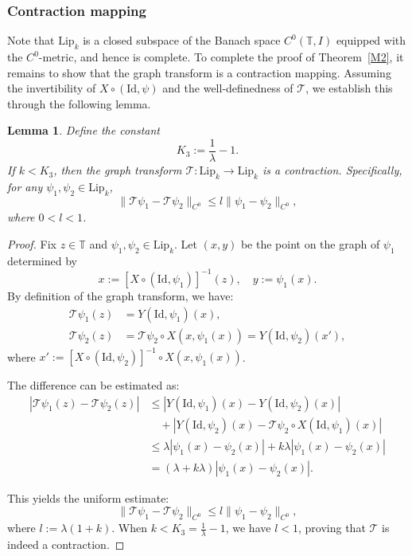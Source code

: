 \documentclass{amsart}
\newcommand{\Lip}{\mathrm{Lip}}
\newcommand{\Id}{\mathrm{Id}}
\newcommand{\T}{\mathbb{T}}
\newtheorem{Lemma}[Definition]{Lemma}
\theoremstyle{definition}
\begin{document}
\subsubsection{Contraction mapping}
Note that $\Lip_k$ is a closed subspace of the Banach space $C^0(\T,I)$ equipped with the $C^0$-metric, and hence is complete. To complete the proof of Theorem~\ref{M2}, it remains to show that the graph transform is a contraction mapping. Assuming the invertibility of $X \circ (\Id,\psi)$ and the well-definedness of $\mathcal{T}$, we establish this through the following lemma.

\begin{Lemma}\label{ctrmap}
Define the constant
\[
K_3 := \frac{1}{\lambda} - 1.
\]
If $k < K_3$, then the graph transform $\mathcal{T}: \Lip_k \to \Lip_k$ is a contraction. Specifically, for any $\psi_1, \psi_2 \in \Lip_k$,
\[
\|\mathcal{T}\psi_1 - \mathcal{T}\psi_2\|_{C^0} \leq l \|\psi_1 - \psi_2\|_{C^0},
\]
where $0 < l < 1$.
\end{Lemma}

\begin{proof}
Fix $z \in \T$ and $\psi_1, \psi_2 \in \Lip_k$. Let $(x,y)$ be the point on the graph of $\psi_1$ determined by
\[
x := [X \circ (\Id, \psi_1)]^{-1}(z), \quad y := \psi_1(x).
\]
By definition of the graph transform, we have:
\begin{align*}
\mathcal{T}\psi_1(z) &= Y(\Id, \psi_1)(x), \\
\mathcal{T}\psi_2(z) &= \mathcal{T}\psi_2 \circ X(x, \psi_1(x)) = Y(\Id, \psi_2)(x'),
\end{align*}
where $x' := [X \circ (\Id, \psi_2)]^{-1} \circ X(x, \psi_1(x))$.

The difference can be estimated as:
\begin{align*}
|\mathcal{T}\psi_1(z) - \mathcal{T}\psi_2(z)|
&\leq |Y(\Id, \psi_1)(x) - Y(\Id, \psi_2)(x)| \\
&\quad + |Y(\Id, \psi_2)(x) - \mathcal{T}\psi_2 \circ X(\Id, \psi_1)(x)| \\
&\leq \lambda |\psi_1(x) - \psi_2(x)| + k\lambda |\psi_1(x) - \psi_2(x)| \\
&= (\lambda + k\lambda) |\psi_1(x) - \psi_2(x)|.
\end{align*}

This yields the uniform estimate:
\[
\|\mathcal{T}\psi_1 - \mathcal{T}\psi_2\|_{C^0} \leq l \|\psi_1 - \psi_2\|_{C^0},
\]
where $l := \lambda(1 + k)$. When $k < K_3 = \frac{1}{\lambda} - 1$, we have $l < 1$, proving that $\mathcal{T}$ is indeed a contraction.
\end{proof}
\end{document}
